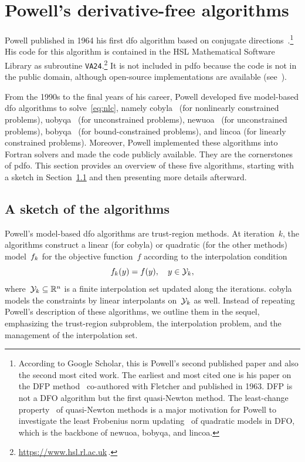 \documentclass{article}
\numberwithin{equation}{section}
\theoremstyle{definition}
\theoremstyle{plain}
\theoremstyle{remark}
\newcommand*{\R}{\mathbb{R}}
\newcommand{\objm}[1][k]{\obj\ifthenelse{\equal{#1}{}}{}{_{#1}}}
\newcommand{\obj}{f}
\newcommand{\xpt}[1][k]{\mathcal{Y}\ifthenelse{\equal{#1}{}}{}{_{#1}}}
\begin{document}
\section{Powell's derivative-free algorithms}
\label{sec:powell}

Powell published in 1964 his first \gls{dfo} algorithm based on conjugate directions~\cite{Powell_1964}.\footnote{According to Google Scholar, this is Powell's second published paper and also the second most cited work.
The earliest and most cited one is his paper on the DFP method~\cite{Fletcher_Powell_1963} co-authored with Fletcher and published in 1963.
DFP is not a DFO algorithm but the first quasi-Newton method.
The least-change property~\cite{Dennis_Schnabel_1979} of quasi-Newton methods is a major motivation for Powell to investigate the least Frobenius norm updating~\cite{Powell_2004b} of quadratic models in DFO, which is the backbone of \gls{newuoa}, \gls{bobyqa}, and \gls{lincoa}.}
His code for this algorithm is contained in the HSL Mathematical Software Library as subroutine \texttt{VA24}.\footnote{\url{https://www.hsl.rl.ac.uk}\,.}
It is not included in \gls{pdfo} because the code is not in the public domain, although open-source implementations are available (see~\cite[Footnote~4]{Conn_Scheinberg_Toint_1997b}).

From the 1990s to the final years of his career, Powell developed five model-based \gls{dfo} algorithms to solve~\eqref{eq:nlc}, namely \gls{cobyla}~\cite{Powell_1994} (for nonlinearly constrained problems), \gls{uobyqa}~\cite{Powell_2002} (for unconstrained problems), \gls{newuoa}~\cite{Powell_2006} (for unconstrained problems), \gls{bobyqa}~\cite{Powell_2009} (for bound-constrained problems), and \gls{lincoa} (for linearly constrained problems).
Moreover, Powell implemented these algorithms into Fortran solvers and made the code publicly available.
They are the cornerstones of \gls{pdfo}.
This section provides an overview of these five algorithms, starting with a sketch in Section~\ref{ssec:sketch} and then presenting more details afterward.

\subsection{A sketch of the algorithms}
\label{ssec:sketch}

Powell's model-based \gls{dfo} algorithms are trust-region methods.
At iteration~$k$, the algorithms construct a linear (for \gls{cobyla}) or quadratic (for the other methods) model~$\objm$ for the objective function~$f$ according to the interpolation condition
\begin{equation}
    \label{eq:itpls}
    \objm(y) = \obj(y), \quad y \in \xpt,
\end{equation}
where~$\xpt \subseteq \R^n$ is a finite interpolation set updated along the iterations.
\Gls{cobyla} models the constraints by linear interpolants on~$\xpt$ as well.
Instead of repeating Powell's description of these algorithms, we outline them in the sequel, emphasizing the trust-region subproblem, the interpolation problem, and the management of the interpolation set.
\end{document}
